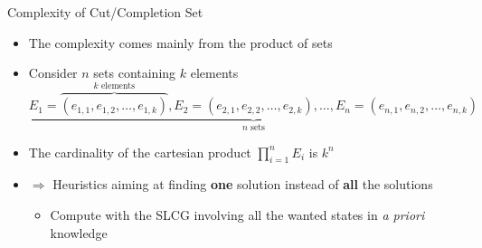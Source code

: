 \documentclass[8pt]{beamer}
\newcommand{\highlight}[1]{\textcolor{blue!50}{\textbf{#1}}}
\begin{document}
\begin{frame}{Complexity of Cut/Completion Set}
    \begin{itemize}
        \item The complexity comes mainly from the product of sets
        \pause
        \item Consider $n$ sets containing $k$ elements
        $\underbrace{E_1=\overbrace{(e_{1,1},e_{1,2},\ldots,e_{1,k})}^\text{$k$ elements},E_2=(e_{2,1},e_{2,2},\ldots,e_{2,k}),\ldots,E_n=(e_{n,1},e_{n,2},\ldots,e_{n,k})}_\text{$n$ sets}$
        \pause
        \item The cardinality of the cartesian product $\prod_{i=1}^{n}{E_i}$ is $k^n$
        \pause
        \item$\Longrightarrow$ Heuristics aiming at finding \highlight{one} solution instead of \highlight{all} the solutions
        \begin{itemize}
            \item Compute with the SLCG involving all the wanted states in \textit{a priori} knowledge
        \end{itemize}
    \end{itemize}
\end{frame}
\end{document}
